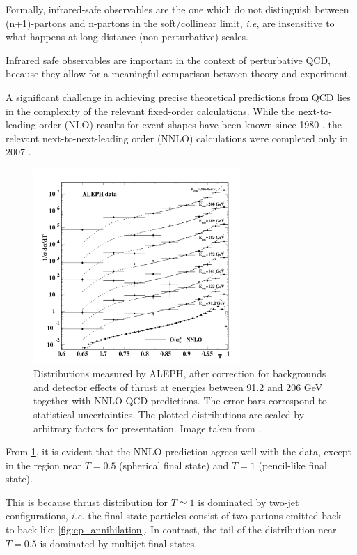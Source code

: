 \documentclass[../Tesi_Jiahao_Miao_986136.tex]{subfiles}
\begin{document}
Formally, infrared-safe observables are the one which do not distinguish between (n+1)-partons and n-partons in the soft/collinear limit, \emph{i.e},
are insensitive to what happens at long-distance (non-perturbative) scales.

Infrared safe observables are important in the context of perturbative QCD, because they allow for a meaningful comparison between theory and experiment. 

A significant challenge in achieving precise theoretical predictions from QCD lies in the complexity of the relevant fixed-order calculations. While the next-to-leading-order (NLO) results 
for event shapes have been known since 1980 \cite{Ellis:1980wv}, the relevant next-to-next-leading order (NNLO) calculations were completed only in 2007 \cite{Gehrmann-DeRidder:2007nzq}.

\begin{figure}[h]
    \centering
    \includegraphics[width=0.7\textwidth]{figures/LEP_Thrust_NNLO.png}
    \caption{Distributions measured by ALEPH, after correction for backgrounds and detector
    effects of thrust at energies between 91.2 and 206
    GeV together with NNLO QCD predictions. The error bars correspond to statistical
    uncertainties. The plotted
    distributions are scaled by arbitrary factors for presentation. Image taken from \cite{Dissertori_2008}.}
    \label{fig:LEP_Thrust_NNLO}
\end{figure}

From \cref{fig:LEP_Thrust_NNLO},  it is evident that the NNLO prediction agrees well with the data, except in the region near $T=0.5$ (spherical final state) and $T=1$ (pencil-like final state).

This is because thrust distribution for $T\simeq 1$ is dominated by two-jet configurations, \emph{i.e.} the final state particles consist of two partons emitted back-to-back like \cref{fig:ep_annihilation}.
In contrast, the tail of the distribution near $T= 0.5$ is dominated by multijet final states.
\end{document}
